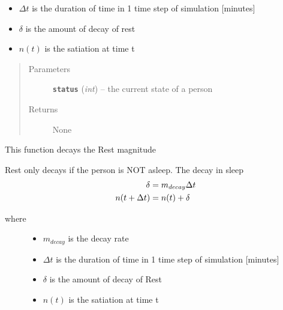 \documentclass[letterpaper,10pt,english]{sphinxmanual}
\begin{document}
\begin{fulllineitems}
\begin{fulllineitems}
\begin{description}
\begin{itemize}
\item {} 
\(\Delta{t}\) is the duration of time in 1 time step of simulation {[}minutes{]}

\item {} 
\(\delta\) is the amount of decay of rest

\item {} 
\(n(t)\) is the satiation at time t

\end{itemize}

\end{description}
\begin{quote}\begin{description}
\item[{Parameters}] \leavevmode
\textbf{\texttt{status}} (\emph{int}) -- the current state of a person

\item[{Returns}] \leavevmode
None

\end{description}\end{quote}

\end{fulllineitems}


\begin{fulllineitems}
\label{rest:rest.Rest.decay_new}
This function decays the Rest magnitude

Rest only decays if the person is NOT asleep.  The decay in sleep
\begin{gather}
\begin{split}\delta &= m_{decay} \Delta{t} \\
n(t + \Delta{t}) &= n(t) + \delta\end{split}\notag
\end{gather}\begin{description}
\item[{where}] \leavevmode\begin{itemize}
\item {} 
\(m_{decay}\) is the decay rate

\item {} 
\(\Delta{t}\) is the duration of time in 1 time step of simulation {[}minutes{]}

\item {} 
\(\delta\) is the amount of decay of Rest

\item {} 
\(n(t)\) is the satiation at time t


\end{itemize}
\end{description}
\end{fulllineitems}
\end{fulllineitems}
\end{document}
